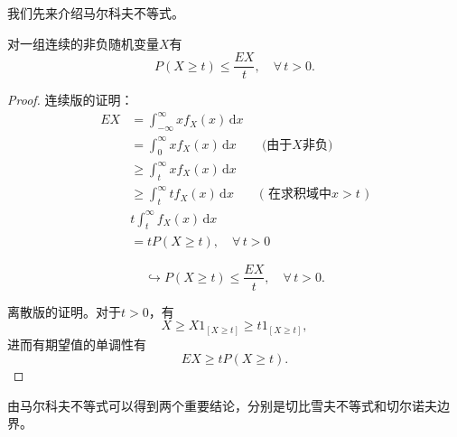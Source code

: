我们先来介绍马尔科夫不等式。
\begin{theorem}[马尔科夫不等式]
  \label{theorem:markov-inequality}
  对一组连续的非负随机变量$X$有
  \begin{equation}
    \label{eq:markov-inequality}
    P \left( X \ge t \right) \le \frac{E X}{t}, \quad \forall \, t > 0.
  \end{equation}
\end{theorem}
\begin{proof}
  连续版的证明：
  \begin{equation*}
    \begin{split}
      E X & = \int_{-\infty}^{\infty} x f_{X} \left( x \right) \, \mathrm{d} x \\
      & = \int_{0}^{\infty} x f_{X} \left( x \right) \, \mathrm{d} x  \qquad \text{(由于$X$非负)}\\
      & \ge \int_{t}^{\infty} x f_{X} \left( x \right) \, \mathrm{d} x \\
      & \ge \int_{t}^{\infty} t f_{X} \left( x \right) \, \mathrm{d} x \qquad \text{( 在求积域中$x > t$ )} \\
      & t \int_{t}^{\infty} f_{X} \left( x \right) \, \mathrm{d} x \\
      & = t P \left( X \ge t \right), \quad \forall \, t>0
    \end{split}
  \end{equation*}

  \begin{equation*}
    \hookrightarrow P \left( X \ge t \right) \le \frac{E X}{t}, \quad \forall \, t > 0.
  \end{equation*}

  离散版的证明。对于$t>0$，有
  \begin{equation*}
    X \ge X1_{\left[X \ge t \right]} \ge t1_{\left[ X \ge t\right]},
  \end{equation*}
  进而有期望值的单调性有
  \begin{equation*}
    EX \ge t P \left( X \ge t \right).
  \end{equation*}
\end{proof}

由马尔科夫不等式可以得到两个重要结论，分别是切比雪夫不等式和切尔诺夫边界。

